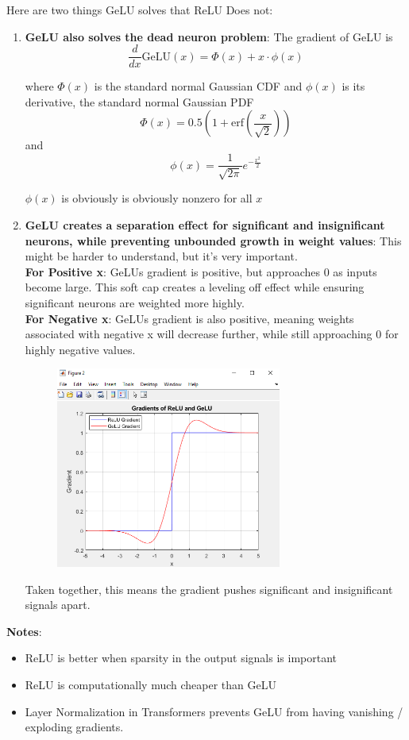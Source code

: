 \documentclass[12pt]{article}
\begin{document}
Here are two things GeLU solves that ReLU Does not: 
\begin{enumerate}
\item \textbf{GeLU also solves the dead neuron problem}: The gradient of GeLU is 
\[
\frac{d}{dx} \text{GeLU}(x) = \Phi(x) + x \cdot \phi(x)
\]

where \(\Phi(x)\) is the standard normal Gaussian CDF and \(\phi(x)\) is its derivative, the standard normal Gaussian PDF
\[
\Phi(x) = 0.5 \left( 1 + \text{erf}\left(\frac{x}{\sqrt{2}}\right) \right)
\]
and
\[
\phi(x) = \frac{1}{\sqrt{2 \pi}} e^{-\frac{x^2}{2}}
\]

\(\phi(x)\) is obviously is obviously nonzero for all \(x\)
\item \textbf{GeLU creates a separation effect for significant and insignificant neurons, while preventing unbounded growth in weight values}: This might be harder to understand, but it's very important. \\

\textbf{For Positive x}: GeLUs gradient is positive, but approaches 0 as inputs become large. This soft cap creates a leveling off effect while ensuring significant neurons are weighted more highly. \\

\textbf{For Negative x}: GeLUs gradient is also positive, meaning weights associated with negative x will decrease further, while still approaching 0 for highly negative values. \\

\begin{figure}[H]
    \centering
    \includegraphics[width=0.7\textwidth]{relugelu.png} %
\end{figure}
Taken together, this means the gradient pushes significant and insignificant signals apart.  
\end{enumerate}
\textbf{Notes}:
\begin{itemize}
\item ReLU is better when sparsity in the output signals is important
\item ReLU is computationally much cheaper than GeLU
\item Layer Normalization in Transformers prevents GeLU from having vanishing / exploding gradients. 
\end{itemize}
\end{document}
